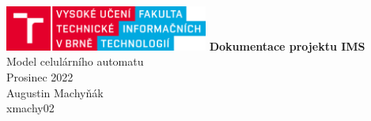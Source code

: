 \documentclass{article}
\begin{document}
\begin{titlepage}
    \centering
    \vfill
    \includegraphics[width=0.5\textwidth]{fit_logo}
    \vfill
    {\Huge{\bfseries{Dokumentace projektu IMS}}\\
        Model celulárního automatu\\
        \vspace*{1em}
        \Large{Prosinec 2022}\\
        \vfill
        Augustin Machyňák\\
        xmachy02
    }
\end{titlepage}

\newpage

\tableofcontents
\newpage


\newpage


\newpage


\newpage


\newpage


\newpage


\newpage



\end{document}
